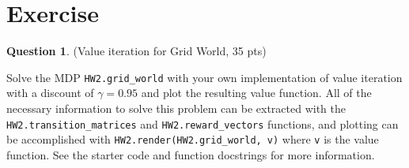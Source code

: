 \documentclass{article}
\theoremstyle{definition}
\newtheorem{question}[thm]{Question}
\begin{document}
% 
% 
% 

\section{Exercise}

\begin{question} \label{q:gw}
    (Value iteration for Grid World, 35 pts)

    Solve the MDP \texttt{HW2.grid\_world} with your own implementation of value iteration with a discount of $\gamma=0.95$ and plot the resulting value function. All of the necessary information to solve this problem can be extracted with the \texttt{HW2.transition\_matrices} and \texttt{HW2.reward\_vectors} functions, and plotting can be accomplished with \texttt{HW2.render(HW2.grid\_world, v)} where \texttt{v} is the value function. See the starter code and function docstrings for more information.
\end{question}
\end{document}

